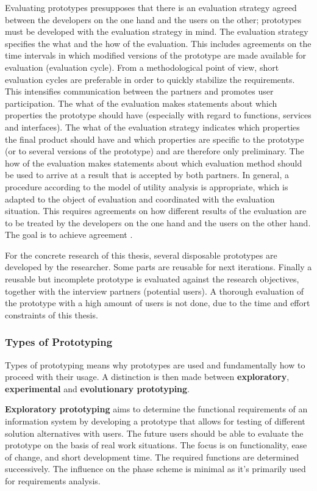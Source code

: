 Evaluating prototypes presupposes that there is an evaluation strategy agreed between the developers on the one hand
and the users on the other; prototypes must be developed with the evaluation strategy in mind.
The evaluation strategy specifies the what and the how of the evaluation.
This includes agreements on the time intervals in which modified versions of the prototype are made available for evaluation (evaluation cycle).
From a methodological point of view, short evaluation cycles are preferable in order to quickly stabilize the requirements.
This intensifies communication between the partners and promotes user participation.
The what of the evaluation makes statements about which properties the prototype should have
(especially with regard to functions, services and interfaces).
The what of the evaluation strategy indicates which properties the final product should have and which properties are specific to the prototype
(or to several versions of the prototype) and are therefore only preliminary.
The how of the evaluation makes statements about which evaluation method should be used to arrive at a result that is accepted by both partners.
In general, a procedure according to the model of utility analysis is appropriate, which is adapted to the object of evaluation
and coordinated with the evaluation situation. This requires agreements on how different results of the evaluation are to be treated
by the developers on the one hand and the users on the other hand. The goal is to achieve agreement
\autocite{riedlManagementInformatik2019}.

For the concrete research of this thesis,
several disposable prototypes are developed
by the researcher.
Some parts are reusable for next iterations.
Finally a reusable but incomplete prototype is evaluated against the research objectives,
together with the interview partners (potential users).
A thorough evaluation of the prototype with a high amount of users is not done,
due to the time and effort constraints of this thesis.

\subsubsection*{Types of Prototyping}

Types of prototyping means why prototypes are used and fundamentally how to proceed with their usage.
A distinction is then made between \textbf{exploratory}, \textbf{experimental} and \textbf{evolutionary prototyping}.

\textbf{Exploratory prototyping} aims to determine the functional requirements of an information system by developing a prototype that allows for testing of different solution alternatives with users.
The future users should be able to evaluate the prototype on the basis of real work situations.
The focus is on functionality, ease of change, and short development time.
The required functions are determined successively.
The influence on the phase scheme is minimal as it's primarily used for requirements analysis.


